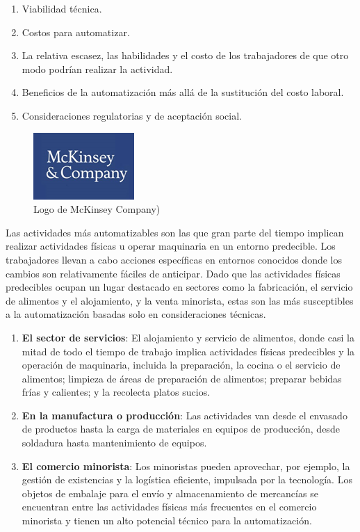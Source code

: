         \begin{enumerate}
           \item {Viabilidad técnica.}
            \item {Costos para automatizar.}
            \item {La relativa escasez, las habilidades y el costo de los trabajadores de que otro modo podrían realizar la actividad.}
           \item {Beneficios de la automatización más allá de la sustitución del costo laboral.}
            \item {Consideraciones regulatorias y de aceptación social.}
    \end{enumerate}
    
    \begin{figure}[h]
        \centering
        \includegraphics[width=0.20\linewidth]{Main/Chapter2/Images2/LOGOMCKINSEY.png}
        \caption{Logo de McKinsey Company)}
        \label{f:Cap2_general_potencial_automatizacion_11}
    \end{figure}
    
    Las actividades más automatizables son las que gran parte del tiempo implican realizar actividades físicas u operar maquinaria en un entorno predecible. Los trabajadores llevan a cabo acciones específicas en entornos conocidos donde los cambios son relativamente fáciles de anticipar. Dado que las actividades físicas predecibles ocupan un lugar destacado en sectores como la fabricación, el servicio de alimentos y el alojamiento, y la venta minorista, estas son las más susceptibles a la automatización basadas solo en consideraciones técnicas.
    
    
    \begin{enumerate}
        \item \textbf{El sector de servicios}: El alojamiento y servicio de alimentos, donde casi la mitad de todo el tiempo de trabajo implica actividades físicas predecibles y la operación de maquinaria, incluida la preparación, la cocina o el servicio de alimentos; limpieza de áreas de preparación de alimentos; preparar bebidas frías y calientes; y la recolecta platos sucios. 
        \item \textbf{En la manufactura o producción}: Las actividades van desde el envasado de productos hasta la carga de materiales en equipos de producción, desde soldadura hasta mantenimiento de equipos.
        \item \textbf{El comercio minorista}: Los minoristas pueden aprovechar, por ejemplo, la gestión de existencias y la logística eficiente, impulsada por la tecnología. Los objetos de embalaje para el envío y almacenamiento de mercancías se encuentran entre las actividades físicas más frecuentes en el comercio minorista y tienen un alto potencial técnico para la automatización.
    \end{enumerate}

